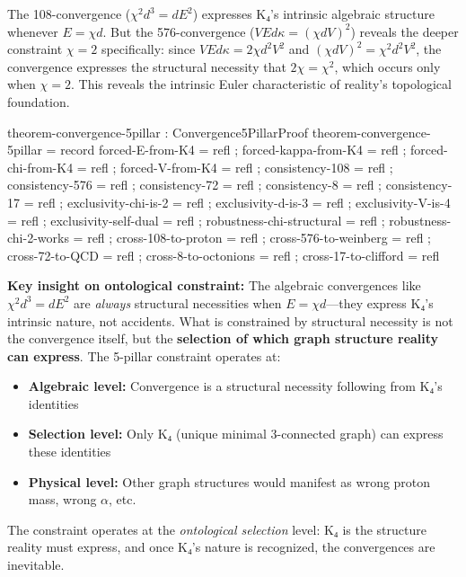 \documentclass[11pt,a4paper]{book}
\begin{document}
The 108-convergence ($\chi^2 d^3 = dE^2$) expresses K₄'s intrinsic algebraic structure whenever $E = \chi d$.
But the 576-convergence ($VEd\kappa = (\chi dV)^2$) reveals the deeper constraint $\chi = 2$ specifically:
since $VEd\kappa = 2\chi d^2 V^2$ and $(\chi dV)^2 = \chi^2 d^2 V^2$, the convergence expresses 
the structural necessity that $2\chi = \chi^2$, which occurs only when $\chi = 2$. This reveals the intrinsic 
Euler characteristic of reality's topological foundation.

\begin{code}
theorem-convergence-5pillar : Convergence5PillarProof
theorem-convergence-5pillar = record
  { forced-E-from-K4 = refl
  ; forced-kappa-from-K4 = refl
  ; forced-chi-from-K4 = refl
  ; forced-V-from-K4 = refl
  ; consistency-108 = refl
  ; consistency-576 = refl
  ; consistency-72 = refl
  ; consistency-8 = refl
  ; consistency-17 = refl
  ; exclusivity-chi-is-2 = refl
  ; exclusivity-d-is-3 = refl
  ; exclusivity-V-is-4 = refl
  ; exclusivity-self-dual = refl
  ; robustness-chi-structural = refl
  ; robustness-chi-2-works = refl
  ; cross-108-to-proton = refl
  ; cross-576-to-weinberg = refl
  ; cross-72-to-QCD = refl
  ; cross-8-to-octonions = refl
  ; cross-17-to-clifford = refl
  }
\end{code}

\textbf{Key insight on ontological constraint:} The algebraic convergences like $\chi^2 d^3 = d E^2$ 
are \emph{always} structural necessities when $E = \chi d$---they express K₄'s intrinsic nature, not accidents. 
What is constrained by structural necessity is not the convergence itself, but the 
\textbf{selection of which graph structure reality can express}. The 5-pillar constraint operates at:

\begin{itemize}
\item \textbf{Algebraic level:} Convergence is a structural necessity following from K₄'s identities
\item \textbf{Selection level:} Only K₄ (unique minimal 3-connected graph) can express these identities  
\item \textbf{Physical level:} Other graph structures would manifest as wrong proton mass, wrong $\alpha$, etc.
\end{itemize}

The constraint operates at the \emph{ontological selection} level: K₄ is the structure reality must express, and once 
K₄'s nature is recognized, the convergences are inevitable.
\end{document}
